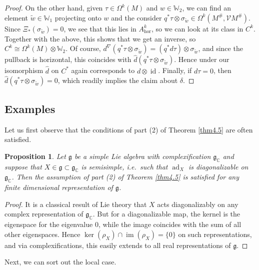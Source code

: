 \documentclass[12pt,a4paper]{amsart}
\def\frak{\mathfrak}
\def\Bbb{\mathbb}
\def\Cal{\mathcal}
\newcommand{\si}{\sigma}
\newcommand{\Om}{\Omega}
\newcommand{\im}{\operatorname{im}}
\newcommand{\id}{\operatorname{id}}
\newcommand{\ad}{\operatorname{ad}}
\newcommand{\hor}{\text{hor}}
\newcounter{theorem}
\numberwithin{theorem}{section}
\newtheorem{prop}[theorem]{Proposition}
\theoremstyle{definition}
\theoremstyle{remark}
\begin{document}
\begin{proof}
  On the other hand, given $\tau\in\Om^k(M)$ and $w\in\Bbb W_2$, we
  can find an element $\tilde w\in\Bbb W_1$ projecting onto $w$ and
  the consider $q^*\tau\otimes\si_{\tilde w}\in\Om^k(M^\#,\Cal
  VM^\#)$. Since $\Xi_*(\si_{\tilde w})=0$, we see that this lies in
  $A^k_\hor$, so we can look at its class in $C^k$. Together with the
  above, this shows that we get an inverse, so
  $C^k\cong\Om^k(M)\otimes\Bbb W_2$. Of course,
  $d^\nabla(q^*\tau\otimes\si_{\tilde w})=(q^*d\tau)\otimes\si_{\tilde
    w}$, and since the pullback is horizontal, this coincides with
  $\hat d(q^*\tau\otimes\si_{\tilde w})$. Hence under our isomorphism
  $\hat d$ on $C^*$ again corresponds to $d\otimes\id$. Finally, if
  $d\tau=0$, then $\hat d(q^*\tau\otimes\si_{\tilde w})=0$, which
  readily implies the claim about $\delta$.
\end{proof}

\subsection{Examples}\label{4.6}
Let us first observe that the conditions of part (2) of Theorem
\ref{thm4.5} are often satisfied.

\begin{prop}\label{prop4.6}
  Let $\frak g$ be a simple Lie algebra with complexification $\frak
  g_{\Bbb C}$ and suppose that $X\in\frak g\subset\frak g_{\Bbb C}$ is
  semisimple, i.e.~such that $\ad_X$ is diagonalizable on $\frak
  g_{\Bbb C}$. Then the assumption of part (2) of Theorem \ref{thm4.5} is
  satisfied for any finite dimensional representation of $\frak g$.
\end{prop}
\begin{proof}
  It is a classical result of Lie theory that $X$ acts diagonalizably
  on any complex representation of $\frak g_{\Bbb C}$. But for a
  diagonalizable map, the kernel is the eigenspace for the eigenvalue
  $0$, while the image coincides with the sum of all other
  eigenspaces. Hence $\ker(\rho_X)\cap\im(\rho_X)=\{0\}$ on such
  representations, and via complexifications, this easily extends to
  all real representations of $\frak g$.
\end{proof}

Next, we can sort out the local case. 
\end{document}
